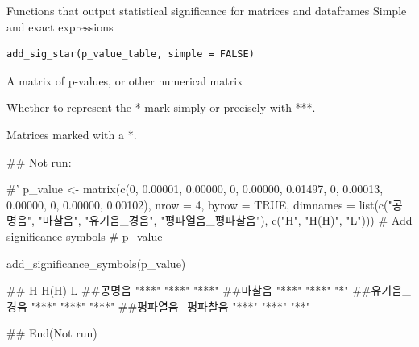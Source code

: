 \documentclass[a4paper]{book}
\begin{document}
%
\begin{Description}
Functions that output statistical significance for matrices and dataframes Simple and exact expressions
\end{Description}
%
\begin{Usage}
\begin{verbatim}
add_sig_star(p_value_table, simple = FALSE)
\end{verbatim}
\end{Usage}
%
\begin{Arguments}
\begin{ldescription}
\item[\code{p\_value\_table}] A matrix of p-values, or other numerical matrix

\item[\code{simple}] Whether to represent the * mark simply or precisely with ***.
\end{ldescription}
\end{Arguments}
%
\begin{Value}
Matrices marked with a *.
\end{Value}
%
\begin{Examples}
\begin{ExampleCode}

 \#\# Not run: 

 #' p_value <- matrix(c(0, 0.00001, 0.00000,
                    0, 0.00000, 0.01497,
                    0, 0.00013, 0.00000,
                    0, 0.00000, 0.00102),
                  nrow = 4, byrow = TRUE,
                  dimnames = list(c("공명음", "마찰음", "유기음_경음", "평파열음_평파찰음"),
                                  c("H", "H(H)", "L")))
     # Add significance symbols
     # p_value

     add_significance_symbols(p_value)

 ##                  H     H(H)  L
 ##공명음            "***" "***" "***"
 ##마찰음            "***" "***" "*"
 ##유기음_경음       "***" "***" "***"
 ##평파열음_평파찰음 "***" "***" "**"




 
## End(Not run)


\end{ExampleCode}
\end{Examples}
\end{document}

